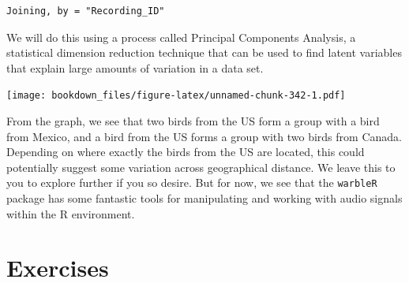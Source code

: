 \documentclass[]{krantz}
\makeatletter
\newenvironment{Shaded}{\begin{snugshade}}{\end{snugshade}}
\newcommand{\KeywordTok}[1]{\textcolor[rgb]{0.27,0.27,0.27}{\textbf{#1}}}
\newcommand{\DataTypeTok}[1]{\textcolor[rgb]{0.27,0.27,0.27}{#1}}
\newcommand{\DecValTok}[1]{\textcolor[rgb]{0.06,0.06,0.06}{#1}}
\newcommand{\StringTok}[1]{\textcolor[rgb]{0.5,0.5,0.5}{#1}}
\newcommand{\CommentTok}[1]{\textcolor[rgb]{0.37,0.37,0.37}{\textit{#1}}}
\newcommand{\OtherTok}[1]{\textcolor[rgb]{0.37,0.37,0.37}{#1}}
\newcommand{\OperatorTok}[1]{\textcolor[rgb]{0.43,0.43,0.43}{\textbf{#1}}}
\newcommand{\ErrorTok}[1]{\textcolor[rgb]{0.14,0.14,0.14}{\textbf{#1}}}
\newcommand{\NormalTok}[1]{#1}
\newenvironment{kframe}{%
\medskip{}
\setlength{\fboxsep}{.8em}
 \def\at@end@of@kframe{}%
 \ifinner\ifhmode%
  \def\at@end@of@kframe{\end{minipage}}%
  \begin{minipage}{\columnwidth}%
 \fi\fi%
 \def\FrameCommand##1{\hskip\@totalleftmargin \hskip-\fboxsep
 \colorbox{shadecolor}{##1}\hskip-\fboxsep
     \hskip-\linewidth \hskip-\@totalleftmargin \hskip\columnwidth}%
 \MakeFramed {\advance\hsize-\width
   \@totalleftmargin\z@ \linewidth\hsize
   \@setminipage}}%
 {\par\unskip\endMakeFramed%
 \at@end@of@kframe}
\renewenvironment{Shaded}{\begin{kframe}}{\end{kframe}}
\makeatother
\begin{document}
\begin{verbatim}
Joining, by = "Recording_ID"
\end{verbatim}

We will do this using a process called Principal Components Analysis, a
statistical dimension reduction technique that can be used to find
latent variables that explain large amounts of variation in a data set.

\begin{Shaded}
\end{Shaded}

\texttt{[image: bookdown\_files/figure-latex/unnamed-chunk-342-1.pdf]}

From the graph, we see that two birds from the US form a group with a
bird from Mexico, and a bird from the US forms a group with two birds
from Canada. Depending on where exactly the birds from the US are
located, this could potentially suggest some variation across
geographical distance. We leave this to you to explore further if you so
desire. But for now, we see that the \texttt{warbleR} package has some
fantastic tools for manipulating and working with audio signals within
the R environment.

\section{Exercises}\label{exercises-11}
\end{document}
